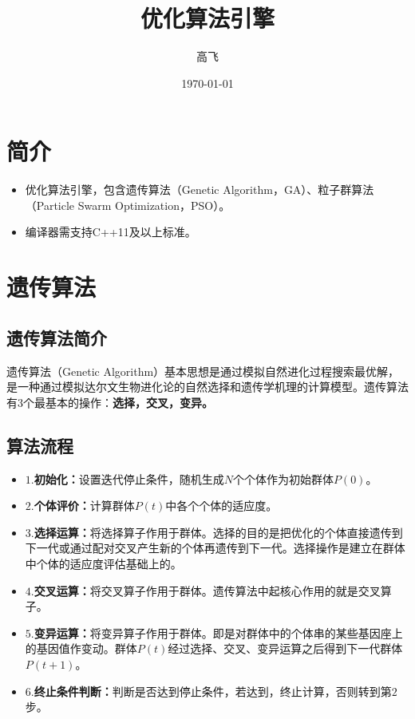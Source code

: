 \documentclass[UTF8]{ctexart}
\title{优化算法引擎}
\author{高飞}
\date{\today}
\begin{document}
\maketitle
\newpage
\tableofcontents
\newpage

\section{简介}

\begin{itemize}
    \item 优化算法引擎，包含遗传算法（Genetic Algorithm，GA）、粒子群算法（Particle Swarm Optimization，PSO）。
    \item 编译器需支持C++11及以上标准。    
\end{itemize}

\section{遗传算法}
\subsection{遗传算法简介}
遗传算法（Genetic Algorithm）基本思想是通过模拟自然进化过程搜索最优解，是一种通过模拟达尔文生物进化论的自然选择和遗传学机理的计算模型。遗传算法有$3$个最基本的操作：\textbf{选择，交叉，变异。}

\subsection{算法流程}
\begin{itemize}
    \item \textbf{$1.$初始化：}设置迭代停止条件，随机生成$N$个个体作为初始群体$P(0)$。
    \item \textbf{$2.$个体评价：}计算群体$P(t)$中各个个体的适应度。
    \item \textbf{$3.$选择运算：}将选择算子作用于群体。选择的目的是把优化的个体直接遗传到下一代或通过配对交叉产生新的个体再遗传到下一代。选择操作是建立在群体中个体的适应度评估基础上的。
    \item \textbf{$4.$交叉运算：}将交叉算子作用于群体。遗传算法中起核心作用的就是交叉算子。
    \item \textbf{$5.$变异运算：}将变异算子作用于群体。即是对群体中的个体串的某些基因座上的基因值作变动。群体$P(t)$经过选择、交叉、变异运算之后得到下一代群体$P(t+1)$。
    \item \textbf{$6.$终止条件判断：}判断是否达到停止条件，若达到，终止计算，否则转到第$2$步。
\end{itemize}
\end{document}
